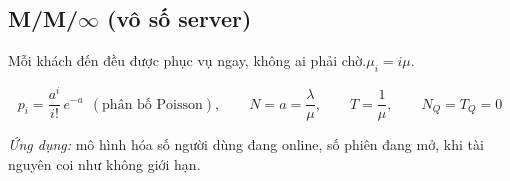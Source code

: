\subsection{\texorpdfstring{M/M/$\infty$}{M/M/∞} (vô số server)}

Mỗi khách đến đều được phục vụ ngay, không ai phải chờ.\quad $\mu_i = i\mu$.
\begin{congthuc}
\[
p_i = \frac{a^i}{i!}\,e^{-a}\ \ (\text{phân bố Poisson}),\qquad N = a = \frac{\lambda}{\mu},\qquad T = \frac{1}{\mu},\qquad N_Q = T_Q = 0
\]
\end{congthuc}
\emph{Ứng dụng:} mô hình hóa số người dùng đang online, số phiên đang mở, khi tài nguyên coi như không giới hạn.

